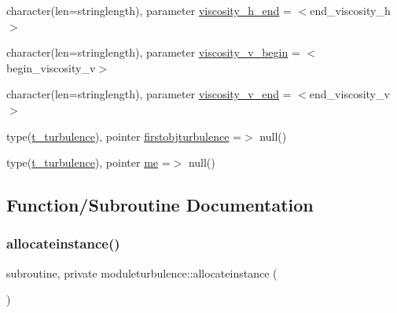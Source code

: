\begin{DoxyCompactItemize}
\item 
character(len=stringlength), parameter \mbox{\hyperlink{namespacemoduleturbulence_a134ebac9140a7aa6099ca4888f990ea8}{viscosity\+\_\+h\+\_\+end}} = \textquotesingle{}$<$end\+\_\+viscosity\+\_\+h$>$\textquotesingle{}
\item 
character(len=stringlength), parameter \mbox{\hyperlink{namespacemoduleturbulence_aa207229e0ff82c7ac123a9b078a51f6a}{viscosity\+\_\+v\+\_\+begin}} = \textquotesingle{}$<$begin\+\_\+viscosity\+\_\+v$>$\textquotesingle{}
\item 
character(len=stringlength), parameter \mbox{\hyperlink{namespacemoduleturbulence_a2b0fb2fa55418700724ffc5e0f294858}{viscosity\+\_\+v\+\_\+end}} = \textquotesingle{}$<$end\+\_\+viscosity\+\_\+v$>$\textquotesingle{}
\item 
type(\mbox{\hyperlink{structmoduleturbulence_1_1t__turbulence}{t\+\_\+turbulence}}), pointer \mbox{\hyperlink{namespacemoduleturbulence_af5759b7ab5d1b988fb35e62f93a6d7ed}{firstobjturbulence}} =$>$ null()
\item 
type(\mbox{\hyperlink{structmoduleturbulence_1_1t__turbulence}{t\+\_\+turbulence}}), pointer \mbox{\hyperlink{namespacemoduleturbulence_aa8a18b46ae48dcd9b22bd9078b5f6c72}{me}} =$>$ null()
\end{DoxyCompactItemize}


\subsection{Function/\+Subroutine Documentation}
\mbox{\label{namespacemoduleturbulence_a90657496e68df9748a112f2c597aeda7}} 
\subsubsection{\texorpdfstring{allocateinstance()}{allocateinstance()}}
{\footnotesize\ttfamily subroutine, private moduleturbulence\+::allocateinstance (\begin{DoxyParamCaption}{ }\end{DoxyParamCaption})\hspace{0.3cm}{\ttfamily [private]}}

\mbox{\label{namespacemoduleturbulence_aed366fd3ef93f5aff7c411412fbeb93a}} 
